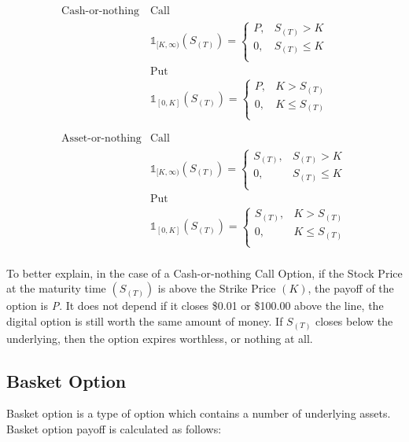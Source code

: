 \documentclass[]{elsarticle}
\theoremstyle{definition}
\theoremstyle{remark}
\begin{document}
$$ \begin{array}{rcc}
\text{Cash-or-nothing} & \text{Call}\\
 & \mathbb{1}_{[K,\infty)}(S_{(T)})=
\begin{cases}
P, & S_{(T)} > K \\
0, & S_{(T)} \leq K\\
\end{cases}\\
 & \text{Put}\\
 & \mathbb{1}_{[0,K]}(S_{(T)})=
\begin{cases}
P, & K > S_{(T)} \\
0, & K \leq S_{(T)}\\
\end{cases} \\
\\
\\
\text{Asset-or-nothing} & \text{Call}\\
& \mathbb{1}_{[K,\infty)}(S_{(T)})=
\begin{cases}
S_{(T)}, & S_{(T)} > K \\
0, & S_{(T)} \leq K\\
\end{cases}\\
& \text{Put}\\
& \mathbb{1}_{[0,K]}(S_{(T)})=
\begin{cases}
S_{(T)}, & K > S_{(T)} \\
0, & K \leq S_{(T)}\\
\end{cases} \\
\end{array} $$

To better explain, in the case of a Cash-or-nothing Call Option, if the Stock Price at the maturity time $(S_{(T)})$ is above the Strike Price $(K)$, the payoff of the option is \textit{P}.  It does not depend if it closes \$0.01 or \$100.00 above the line, the  digital option is still worth the same amount of money. If $S_{(T)}$  closes below the underlying, then the option expires worthless, or 
nothing at all.


\subsection{Basket Option}

Basket option is a type of option  which contains a number of underlying assets. Basket option payoff is calculated as follows:
\end{document}

